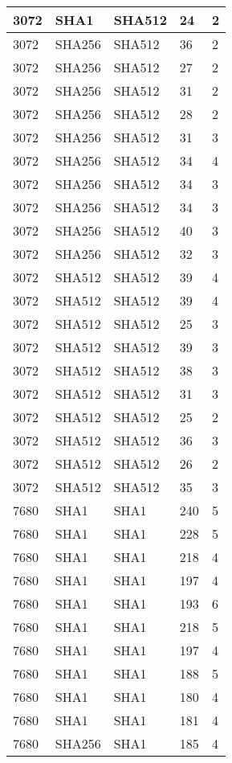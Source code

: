 \begin{tabular}{| l | l | l | l | l |}
3072 & SHA1 & SHA512 & 24 & 2 \\ \hline 
3072 & SHA256 & SHA512 & 36 & 2 \\ \hline 
3072 & SHA256 & SHA512 & 27 & 2 \\ \hline 
3072 & SHA256 & SHA512 & 31 & 2 \\ \hline 
3072 & SHA256 & SHA512 & 28 & 2 \\ \hline 
3072 & SHA256 & SHA512 & 31 & 3 \\ \hline 
3072 & SHA256 & SHA512 & 34 & 4 \\ \hline 
3072 & SHA256 & SHA512 & 34 & 3 \\ \hline 
3072 & SHA256 & SHA512 & 34 & 3 \\ \hline 
3072 & SHA256 & SHA512 & 40 & 3 \\ \hline 
3072 & SHA256 & SHA512 & 32 & 3 \\ \hline 
3072 & SHA512 & SHA512 & 39 & 4 \\ \hline 
3072 & SHA512 & SHA512 & 39 & 4 \\ \hline 
3072 & SHA512 & SHA512 & 25 & 3 \\ \hline 
3072 & SHA512 & SHA512 & 39 & 3 \\ \hline 
3072 & SHA512 & SHA512 & 38 & 3 \\ \hline 
3072 & SHA512 & SHA512 & 31 & 3 \\ \hline 
3072 & SHA512 & SHA512 & 25 & 2 \\ \hline 
3072 & SHA512 & SHA512 & 36 & 3 \\ \hline 
3072 & SHA512 & SHA512 & 26 & 2 \\ \hline 
3072 & SHA512 & SHA512 & 35 & 3 \\ \hline 
7680 & SHA1 & SHA1 & 240 & 5 \\ \hline 
7680 & SHA1 & SHA1 & 228 & 5 \\ \hline 
7680 & SHA1 & SHA1 & 218 & 4 \\ \hline 
7680 & SHA1 & SHA1 & 197 & 4 \\ \hline 
7680 & SHA1 & SHA1 & 193 & 6 \\ \hline 
7680 & SHA1 & SHA1 & 218 & 5 \\ \hline 
7680 & SHA1 & SHA1 & 197 & 4 \\ \hline 
7680 & SHA1 & SHA1 & 188 & 5 \\ \hline 
7680 & SHA1 & SHA1 & 180 & 4 \\ \hline 
7680 & SHA1 & SHA1 & 181 & 4 \\ \hline 
7680 & SHA256 & SHA1 & 185 & 4 \\ \hline 

\end{tabular}
